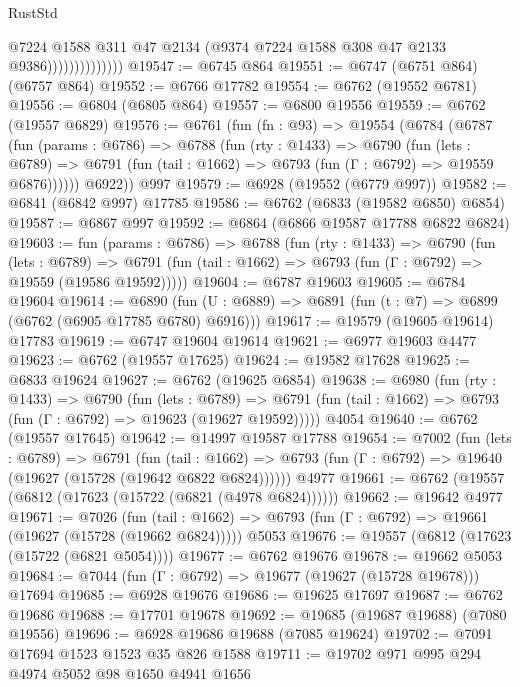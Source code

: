 \begin{lexlean}{RustStd}
\begin{coremodule}
                              @7224
                              @1588
                              @311
                              @47
                              @2134
                              (@9374 @7224 @1588 @308 @47 @2133 @9386))))))))))))))
@19547 := @6745 @864
@19551 := @6747 (@6751 @864) (@6757 @864)
@19552 := @6766 @17782
@19554 := @6762 (@19552 @6781)
@19556 := @6804 (@6805 @864)
@19557 := @6800 @19556
@19559 := @6762 (@19557 @6829)
@19576 := @6761
    (fun (fn : @93) =>
    @19554
      (@6784
        (@6787
          (fun (params : @6786) =>
          @6788
            (fun (rty : @1433) =>
            @6790
              (fun (lets : @6789) =>
              @6791 (fun (tail : @1662) => @6793 (fun (Γ : @6792) => @19559 @6876))))))
        @6922))
    @997
@19579 := @6928 (@19552 (@6779 @997))
@19582 := @6841 (@6842 @997) @17785
@19586 := @6762 (@6833 (@19582 @6850) @6854)
@19587 := @6867 @997
@19592 := @6864 (@6866 @19587 @17788 @6822 @6824)
@19603 := fun (params : @6786) =>
  @6788
    (fun (rty : @1433) =>
    @6790
      (fun (lets : @6789) =>
      @6791 (fun (tail : @1662) => @6793 (fun (Γ : @6792) => @19559 (@19586 @19592)))))
@19604 := @6787 @19603
@19605 := @6784 @19604
@19614 := @6890
    (fun (U : @6889) => @6891 (fun (t : @7) => @6899 (@6762 (@6905 @17785 @6780) @6916)))
@19617 := @19579 (@19605 @19614) @17783
@19619 := @6747 @19604 @19614
@19621 := @6977 @19603 @4477
@19623 := @6762 (@19557 @17625)
@19624 := @19582 @17628
@19625 := @6833 @19624
@19627 := @6762 (@19625 @6854)
@19638 := @6980
    (fun (rty : @1433) =>
    @6790
      (fun (lets : @6789) =>
      @6791 (fun (tail : @1662) => @6793 (fun (Γ : @6792) => @19623 (@19627 @19592)))))
    @4054
@19640 := @6762 (@19557 @17645)
@19642 := @14997 @19587 @17788
@19654 := @7002
    (fun (lets : @6789) =>
    @6791
      (fun (tail : @1662) =>
      @6793 (fun (Γ : @6792) => @19640 (@19627 (@15728 (@19642 @6822 @6824))))))
    @4977
@19661 := @6762 (@19557 (@6812 (@17623 (@15722 (@6821 (@4978 @6824))))))
@19662 := @19642 @4977
@19671 := @7026
    (fun (tail : @1662) => @6793 (fun (Γ : @6792) => @19661 (@19627 (@15728 (@19662 @6824)))))
    @5053
@19676 := @19557 (@6812 (@17623 (@15722 (@6821 @5054))))
@19677 := @6762 @19676
@19678 := @19662 @5053
@19684 := @7044 (fun (Γ : @6792) => @19677 (@19627 (@15728 @19678))) @17694
@19685 := @6928 @19676
@19686 := @19625 @17697
@19687 := @6762 @19686
@19688 := @17701 @19678
@19692 := @19685 (@19687 @19688) (@7080 @19556)
@19696 := @6928 @19686 @19688 (@7085 @19624)
@19702 := @7091 @17694 @1523 @1523 @35 @826 @1588
@19711 := @19702 @971 @995 @294 @4974 @5052 @98 @1650 @4941 @1656

\end{coremodule}
\end{lexlean}

